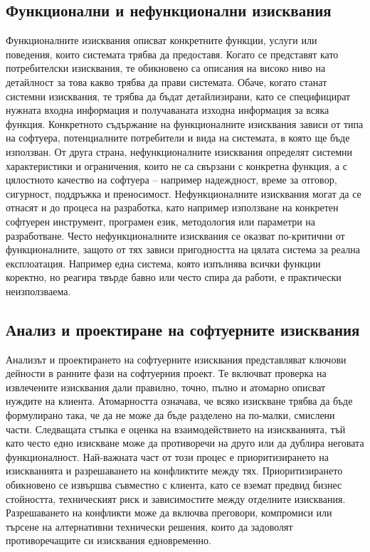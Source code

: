 \documentclass{article}
\renewcommand{\\}{\newline}
\begin{document}
\subsection{Функционални и нефункционални изисквания}
Функционалните изисквания описват конкретните функции, услуги или поведения, които системата трябва да предоставя. Когато се представят като потребителски изисквания, те обикновено са описания на високо ниво на детайлност за това какво трябва да прави системата. Обаче, когато станат системни изисквания, те трябва да бъдат детайлизирани, като се специфицират нужната входна информация и получаваната изходна информация за всяка функция. Конкретното съдържание на функционалните изисквания зависи от типа на софтуера, потенциалните потребители и вида на системата, в която ще бъде използван. От друга страна, нефункционалните изисквания определят системни характеристики и ограничения, които не са свързани с конкретна функция, а с цялостното качество на софтуера – например надеждност, време за отговор, сигурност, поддръжка и преносимост. Нефункционалните изисквания могат да се отнасят и до процеса на разработка, като например използване на конкретен софтуерен инструмент, програмен език, методология или параметри на разработване. Често нефункционалните изисквания се оказват по-критични от функционалните, защото от тях зависи пригодността на цялата система за реална експлоатация. Например една система, която изпълнява всички функции коректно, но реагира твърде бавно или често спира да работи, е практически неизползваема.

\subsection{Анализ и проектиране на софтуерните изисквания}
Анализът и проектирането на софтуерните изисквания представляват ключови дейности в ранните фази на софтуерния проект. Те включват проверка на извлечените изисквания дали правилно, точно, пълно и атомарно описват нуждите на клиента. Атомарността означава, че всяко изискване трябва да бъде формулирано така, че да не може да бъде разделено на по-малки, смислени части. Следващата стъпка е оценка на взаимодействието на изискванията, тъй като често едно изискване може да противоречи на друго или да дублира неговата функционалност. Най-важната част от този процес е приоритизирането на изискванията и разрешаването на конфликтите между тях. Приоритизирането обикновено се извършва съвместно с клиента, като се вземат предвид бизнес стойността, техническият риск и зависимостите между отделните изисквания. Разрешаването на конфликти може да включва преговори, компромиси или търсене на алтернативни технически решения, които да задоволят противоречащите си изисквания едновременно.
\end{document}
